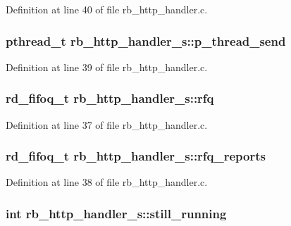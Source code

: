 Definition at line 40 of file rb\-\_\-http\-\_\-handler.\-c.

\hypertarget{structrb__http__handler__s_ae969c34a0421fe32951cb31802735f13}{
\subsubsection[{p\-\_\-thread\-\_\-send}]{\setlength{\rightskip}{0pt plus 5cm}pthread\-\_\-t rb\-\_\-http\-\_\-handler\-\_\-s\-::p\-\_\-thread\-\_\-send}}\label{structrb__http__handler__s_ae969c34a0421fe32951cb31802735f13}


Definition at line 39 of file rb\-\_\-http\-\_\-handler.\-c.

\hypertarget{structrb__http__handler__s_a39160211aefb64ec052138229da98632}{
\subsubsection[{rfq}]{\setlength{\rightskip}{0pt plus 5cm}rd\-\_\-fifoq\-\_\-t rb\-\_\-http\-\_\-handler\-\_\-s\-::rfq}}\label{structrb__http__handler__s_a39160211aefb64ec052138229da98632}


Definition at line 37 of file rb\-\_\-http\-\_\-handler.\-c.

\hypertarget{structrb__http__handler__s_a383f2047cfcdd9fe49d0deacf770a73c}{
\subsubsection[{rfq\-\_\-reports}]{\setlength{\rightskip}{0pt plus 5cm}rd\-\_\-fifoq\-\_\-t rb\-\_\-http\-\_\-handler\-\_\-s\-::rfq\-\_\-reports}}\label{structrb__http__handler__s_a383f2047cfcdd9fe49d0deacf770a73c}


Definition at line 38 of file rb\-\_\-http\-\_\-handler.\-c.

\hypertarget{structrb__http__handler__s_aa49e97bedda03106912088dad0b75e64}{
\subsubsection[{still\-\_\-running}]{\setlength{\rightskip}{0pt plus 5cm}int rb\-\_\-http\-\_\-handler\-\_\-s\-::still\-\_\-running}}\label{structrb__http__handler__s_aa49e97bedda03106912088dad0b75e64}


